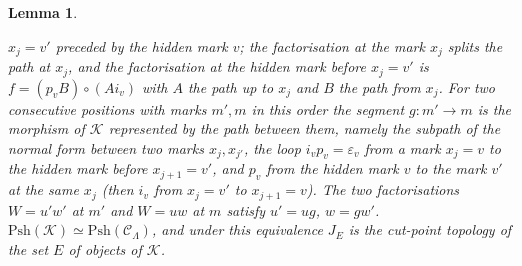 \documentclass[11pt]{amsart}
\newtheorem{lem}[thm]{Lemma}
\theoremstyle{definition}
\newcommand{\Psh}{\mathrm{Psh}}
\begin{document}
\begin{lem}
\begin{enumerate}
$x_j=v'$ preceded by the hidden mark $v$; the factorisation at the mark
$x_j$ splits the path at $x_j$, and the factorisation at the hidden mark
before $x_j=v'$ is $f=(p_vB)\circ(Ai_v)$ with $A$ the path up to $x_j$
and $B$ the path from $x_j$. For two consecutive positions with marks
$m',m$ in this order the \emph{segment} $g\colon m'\to m$ is the
morphism of $\mathcal K$ represented by the path between them, namely
the subpath of the normal form between two marks $x_j,x_{j'}$, the loop
$i_vp_v=\varepsilon_v$ from a mark $x_j=v$ to the hidden mark before
$x_{j+1}=v'$, and $p_v$ from the hidden mark $v$ to the mark $v'$ at the
same $x_j$ (then $i_v$ from $x_j=v'$ to $x_{j+1}=v$). The two
factorisations $W=u'w'$ at $m'$ and $W=uw$ at $m$ satisfy $u'=ug$,
$w=gw'$. $\Psh(\mathcal K)\simeq\Psh(\mathcal
C_\Lambda)$, and under this equivalence $J_E$ is the cut-point topology
of the set $E$ of objects of $\mathcal K$.
\end{enumerate}
\end{lem}
\end{document}

